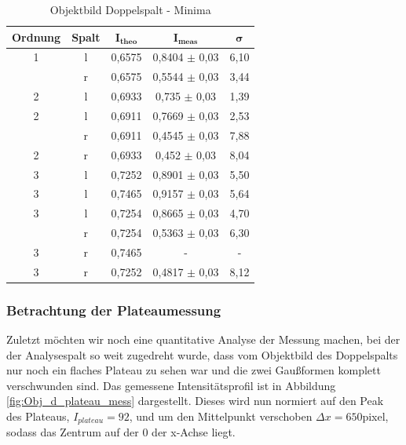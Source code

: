\documentclass{article}
\begin{document}
\begin{table}[!p]
    \centering
    \begin{tabular}{ccccc}
        \hline
        \textbf{Ordnung} & \textbf{Spalt} & $\bm{I_{theo}}$ & $\bm{I_{meas}}$ & $\bm{\sigma}$ \\ \hline
             1 & l & 0,6575 &                 0,8404 $\pm$ 0,03 &    6,10  \\ \hdashline
             1 & r & 0,6575 &                 0,5544 $\pm$ 0,03 &    3,44 \\ \hline
             2 & l & 0,6933 &                 0,735  $\pm$ 0,03 &    1,39 \\
             2 & l & 0,6911 &                 0,7669 $\pm$ 0,03 &    2,53 \\ \hdashline
             2 & r & 0,6911 &                 0,4545 $\pm$ 0,03 &    7,88 \\
             2 & r & 0,6933 &                 0,452  $\pm$ 0,03 &    8,04 \\ \hline
             3 & l & 0,7252 &                 0,8901 $\pm$ 0,03 &    5,50  \\
             3 & l & 0,7465 &                 0,9157 $\pm$ 0,03 &    5,64 \\
             3 & l & 0,7254 &                 0,8665 $\pm$ 0,03 &    4,70  \\ \hdashline
             3 & r & 0,7254 &                 0,5363 $\pm$ 0,03 &    6,30  \\
             3 & r & 0,7465 &               - &  -    \\
             3 & r & 0,7252 &                 0,4817 $\pm$ 0,03 &    8,12 \\ \hline
    \end{tabular}%
    \caption{Objektbild Doppelspalt - Minima}
    \label{tab:Doppel_Obj_Minima}
\end{table}

\clearpage
\newpage

\subsubsection{Betrachtung der Plateaumessung}

Zuletzt möchten wir noch eine quantitative Analyse der Messung machen, bei der der Analysespalt so weit zugedreht wurde, dass vom Objektbild des Doppelspalts nur noch ein flaches Plateau zu sehen war und die zwei Gaußformen komplett verschwunden sind. Das gemessene Intensitätsprofil ist in Abbildung \ref{fig:Obj_d_plateau_mess} dargestellt. Dieses wird nun normiert auf den Peak des Plateaus, $I_{plateau} = 92$, und um den Mittelpunkt verschoben $\Delta x = 650$pixel, sodass das Zentrum auf der 0 der x-Achse liegt.
\end{document}
